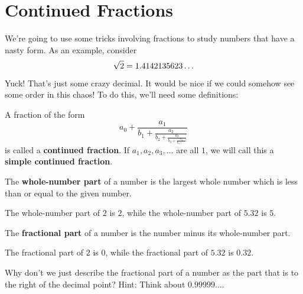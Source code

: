 \newpage
\section{Continued Fractions}

We're going to use some tricks involving fractions to study numbers
that have a nasty form. As an example, consider 
\[
\sqrt{2} = 1.4142135623\dots \index{sqrt2@$\sqrt{2}$}
\]
Yuck! That's just some crazy decimal. It would be nice if we could
somehow see some order in this chaos! To do this, we'll need some
definitions:

\begin{dfn} A fraction of the form
\[
a_0 + \frac{a_1}{\displaystyle b_1 
          + \frac{a_2}{\displaystyle b_2 
          + \frac{a_3}{\displaystyle b_3 
       + \frac{a_4}{\displaystyle b_4 + \cdots
}}}}
\]
is called a \textbf{continued fraction}. If $a_1,a_2,a_3,\dots$ are
all $1$, we will call this a \textbf{simple continued fraction}.
\end{dfn}


\begin{dfn} 
The \textbf{whole-number part} of a number is the largest whole number
which is less than or equal to the given number.
\end{dfn}

\begin{eg} 
The whole-number part of $2$ is $2$, while the whole-number part of
$5.32$ is $5$.
\end{eg}

\begin{dfn} 
The \textbf{fractional part} of a number is the number minus its
whole-number part.
\end{dfn}

\begin{eg} 
The fractional part of $2$ is $0$, while the fractional part of $5.32$
is $0.32$.
\end{eg}


\begin{ques} 
Why don't we just describe the fractional part of a number as the part
that is to the right of the decimal point? Hint: Think about
$0.99999\dots$.
\end{ques}
\QM

